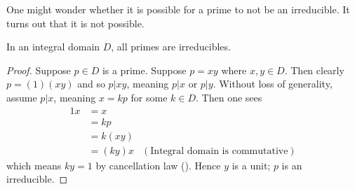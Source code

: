 One might wonder whether it is possible for a prime to not be an irreducible. It turns out that it is not possible.
\begin{theorem}\label{thrm-in-integral-domain-primes-are-irreducibles}
    In an integral domain $D$, all primes are irreducibles.
\end{theorem}
\begin{proof}
    Suppose $p \in D$ is a prime. Suppose $p = xy$ where $x, y\in D$. Then clearly $p = (1)(xy)$ and so $p \vert xy$, meaning $p \vert x$ or $p \vert y$. Without loss of generality, assume $p \vert x$, meaning $x = kp$ for some $k \in D$. Then one sees
    \begin{align*}
        1x &= x\\
        &= kp\\
        &= k(xy)\\
        &= (ky)x & (\text{Integral domain is commutative})
    \end{align*}
    which means $ky = 1$ by cancellation law (). Hence $y$ is a unit; $p$ is an irreducible.
\end{proof}

